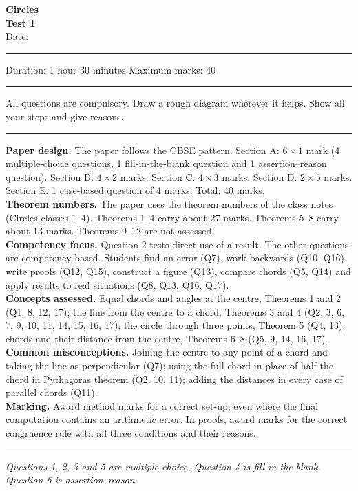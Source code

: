 \documentclass[11pt,a4paper]{article}
\newcommand{\nl}{\\[3pt]}
\newcommand{\sect}[1]{\par\medskip\Needspace{15\baselineskip}{\small\bfseries #1}\par\nopagebreak\smallskip}
\begin{document}
\begin{center}
{\Large\bfseries Circles}\\[3pt]
{\large\bfseries Test 1}\\[5pt]
Date: \rule{3cm}{0.4pt} \quad Duration: 1 hour 30 minutes \quad Maximum marks: 40
\end{center}
\vspace{-6pt}
\noindent\rule{\linewidth}{0.6pt}\par
\vspace{3pt}
{\centering\small All questions are compulsory. Draw a rough diagram wherever it helps. Show all your steps and give reasons.\par}
\ifteacher
\vspace{4pt}
{\color{thinrule}\noindent\rule{\linewidth}{0.4pt}}\par
\vspace{4pt}
{\small\color{muted}\linespread{1.15}\selectfont
\textbf{Paper design.} The paper follows the CBSE pattern. Section A: $6\times1$ mark (4 multiple-choice questions, 1 fill-in-the-blank question and 1 assertion--reason question). Section B: $4\times2$ marks. Section C: $4\times3$ marks. Section D: $2\times5$ marks. Section E: 1 case-based question of 4 marks. Total: 40 marks.\nl
\textbf{Theorem numbers.} The paper uses the theorem numbers of the class notes (Circles classes 1--4). Theorems 1--4 carry about 27 marks. Theorems 5--8 carry about 13 marks. Theorems 9--12 are not assessed.\nl
\textbf{Competency focus.} Question 2 tests direct use of a result. The other questions are competency-based. Students find an error (Q7), work backwards (Q10, Q16), write proofs (Q12, Q15), construct a figure (Q13), compare chords (Q5, Q14) and apply results to real situations (Q8, Q13, Q16, Q17).\nl
\textbf{Concepts assessed.} Equal chords and angles at the centre, Theorems 1 and 2 (Q1, 8, 12, 17); the line from the centre to a chord, Theorems 3 and 4 (Q2, 3, 6, 7, 9, 10, 11, 14, 15, 16, 17); the circle through three points, Theorem 5 (Q4, 13); chords and their distance from the centre, Theorems 6--8 (Q5, 9, 14, 16, 17).\nl
\textbf{Common misconceptions.} Joining the centre to any point of a chord and taking the line as perpendicular (Q7); using the full chord in place of half the chord in Pythagoras theorem (Q2, 10, 11); adding the distances in every case of parallel chords (Q11).\nl
\textbf{Marking.} Award method marks for a correct set-up, even where the final computation contains an arithmetic error. In proofs, award marks for the correct congruence rule with all three conditions and their reasons.\par}
\vspace{4pt}
{\color{thinrule}\noindent\rule{\linewidth}{0.4pt}}\par
\vspace{3pt}
\fi
\sect{Section A (1 mark each)}
{\small\itshape Questions 1, 2, 3 and 5 are multiple choice. Question 4 is fill in the blank. Question 6 is assertion--reason.\par}
\end{document}
